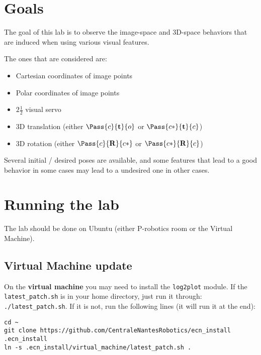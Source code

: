 \documentclass{ecnreport}
\author{O. Kermorgant}
\begin{document}


\section{Goals}

The goal of this lab is to observe the image-space and 3D-space behaviors that are induced when using various visual features.

The ones that are considered are:
\begin{itemize}
 \item Cartesian coordinates of image points
 \item Polar coordinates of image points
 \item $2\frac{1}{2}$ visual servo
 \item 3D translation (either $\Pass{c}{\mathbf{t}}{o}$ or $\Pass{c*}{\mathbf{t}}{c}$)
 \item 3D rotation (either $\Pass{c}{\mathbf{R}}{c*}$ or $\Pass{c*}{\mathbf{R}}{c}$)
\end{itemize}

Several initial / desired poses are available, and some features that lead to a good behavior in some cases may lead to a undesired one in other cases.

\section{Running the lab}

The lab should be done on Ubuntu (either P-robotics room or the Virtual Machine).\\

\subsection{Virtual Machine update}
On the \textbf{virtual machine} you may need to install the \texttt{log2plot} module. If the \texttt{latest\_patch.sh} is in your home directory, just run it through: \texttt{./latest\_patch.sh}. If it is not, run the following lines (it will run it at the end):
\begin{center}\bashstyle
 \begin{lstlisting}
cd ~
git clone https://github.com/CentraleNantesRobotics/ecn_install .ecn_install
ln -s .ecn_install/virtual_machine/latest_patch.sh . 
\end{lstlisting}
\end{center}
\end{document}

